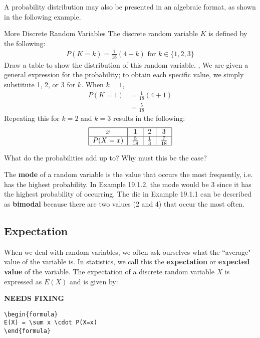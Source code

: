 \documentclass[../../main.tex]{subfiles}
\begin{document}
A probability distribution may also be presented in an algebraic format, as shown in the following example.
\begin{example}{More Discrete Random Variables}
The discrete random variable $K$ is defined by the following:
\begin{align}
P(K=k) = \frac{1}{18}(4+k) \text{ for } k \in \{1, 2, 3\}
\end{align}
Draw a table to show the distribution of this random variable.
\sep
We are given a general expression for the probability; to obtain each specific value, we simply substitute 1, 2, or 3 for $k$. When $k = 1$, 
\begin{align}
P(K=1) &= \frac{1}{18}(4+1) \\ 
&=\frac{5}{18}
\end{align}
Repeating this for $k = 2$ and $k = 3$ results in the following:
\begin{align}
\begin{tabular}{ |c|c|c|c| } 
 \hline
 $x$ & 1 & 2 & 3 \\ 
 \hline
 $P(X=x)$ & $\frac{5}{18}$ & $\frac{1}{3}$ & $\frac{7}{18}$ \\ 
 \hline
\end{tabular}
\end{align}
\subtitle{Insight}
What do the probabilities add up to? Why must this be the case?
\end{example}

The \textbf{mode} of a random variable is the value that occurs the most frequently, i.e. has the highest probability. In Example 19.1.2, the mode would be 3 since it has the highest probability of occurring. The die in Example 19.1.1 can be described as \textbf{bimodal} because there are two values (2 and 4) that occur the most often.

\subsection{Expectation}
When we deal with random variables, we often ask ourselves what the ``average" value of the variable is. In statistics, we call this the \textbf{expectation} or \textbf{expected value} of the variable. The expectation of a discrete random variable $X$ is expressed as $E(X)$ and is given by:

{\hfill\Large\bfseries NEEDS FIXING\hfill}
\begin{lstlisting}
\begin{formula}
E(X) = \sum x \cdot P(X=x)
\end{formula}
 \end{lstlisting}
\end{document}

